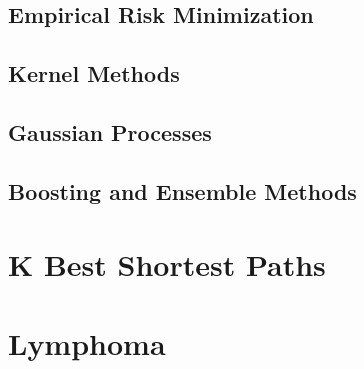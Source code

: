 \subsection{Empirical Risk Minimization}

\subsection{Kernel Methods}

\subsection{Gaussian Processes}

\subsection{Boosting and Ensemble Methods}

\section{K Best Shortest Paths}

\section{Lymphoma}
